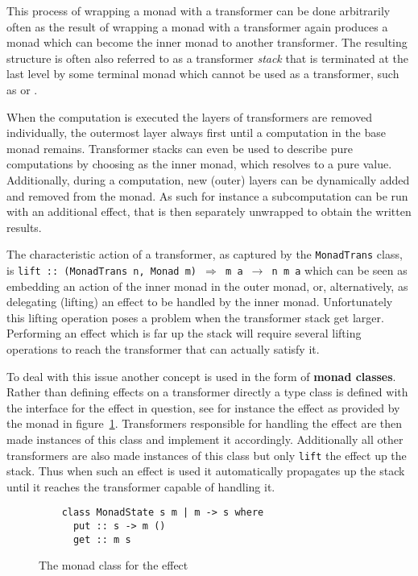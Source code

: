 This process of wrapping a monad with a transformer can be done
arbitrarily often as the result of wrapping a monad with a transformer
again produces a monad which can become the inner monad to another
transformer. The resulting structure is often also referred to as a
transformer \emph{stack} that is terminated at the last level by some
terminal monad which cannot be used as a transformer, such as \IOM{}
or \HandlerForM{}.

When the computation is executed the layers of transformers are
removed individually, the outermost layer always first until a
computation in the base monad remains. Transformer stacks can even be
used to describe pure computations by choosing \IdentityM{} as the
inner monad, which resolves to a pure value.  Additionally, during a
computation, new (outer) layers can be dynamically added and removed
from the monad. As such for instance a subcomputation can be run with
an additional \WriterM{} effect, that is then separately unwrapped to
obtain the written results.

The characteristic action of a transformer, as captured by the
\texttt{MonadTrans} class, is \texttt{lift :: (MonadTrans n, Monad m)
  $\Rightarrow$ m a $\rightarrow$ n m a} which can be seen as embedding an action of the
inner monad in the outer monad, or, alternatively, as delegating
(lifting) an effect to be handled by the inner monad. Unfortunately
this lifting operation poses a problem when the transformer stack get
larger. Performing an effect which is far up the stack will require
several lifting operations to reach the transformer that can actually
satisfy it.

To deal with this issue another concept is used in the form of
\textbf{monad classes}. Rather than defining effects on a transformer
directly a type class is defined with the interface for the effect in
question, see for instance the effect as provided by the \StateM{}
monad in figure~\ref{fig:monad-class-example}. Transformers
responsible for handling the effect are then made instances of this
class and implement it accordingly. Additionally all other
transformers are also made instances of this class but only
\texttt{lift} the effect up the stack. Thus when such an effect is
used it automatically propagates up the stack until it reaches the
transformer capable of handling it.

\begin{figure}
  \begin{lstlisting}
    class MonadState s m | m -> s where
      put :: s -> m ()
      get :: m s
  \end{lstlisting}
  \caption{The monad class for the \StateM{} effect}
  \label{fig:monad-class-example}
\end{figure}

